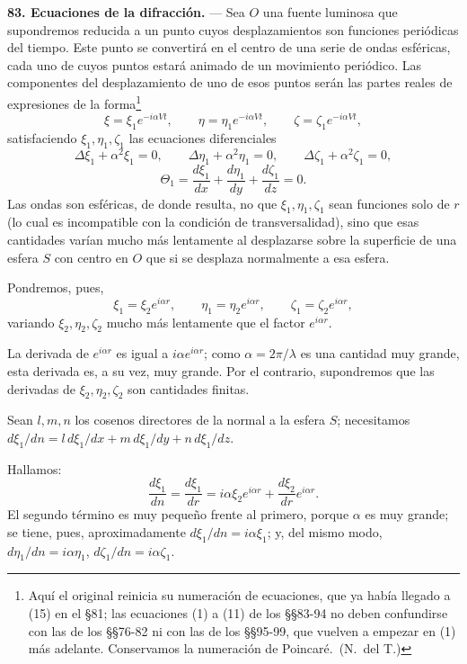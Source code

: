 \noindent\textbf{83. Ecuaciones de la difracción.} — Sea $O$ una fuente
luminosa que supondremos reducida a un punto cuyos desplazamientos son
funciones periódicas del tiempo. Este punto se convertirá en el centro de
una serie de ondas esféricas, cada uno de cuyos puntos estará animado de
un movimiento periódico. Las componentes del desplazamiento de uno de
esos puntos serán las partes reales de expresiones de la
forma\footnote{Aquí el original reinicia su numeración de ecuaciones,
que ya había llegado a (15) en el §81; las ecuaciones (1) a (11) de los
§§83-94 no deben confundirse con las de los §§76-82 ni con las de los
§§95-99, que vuelven a empezar en (1) más adelante. Conservamos la
numeración de Poincaré.~(N.~del T.)}
\begin{equation}
\xi=\xi_1e^{-i\alpha Vt},\qquad \eta=\eta_1e^{-i\alpha Vt},\qquad
\zeta=\zeta_1e^{-i\alpha Vt},
\tag{1}
\end{equation}
satisfaciendo $\xi_1,\eta_1,\zeta_1$ las ecuaciones diferenciales
\begin{equation}
\Delta\xi_1+\alpha^2\xi_1=0,\qquad \Delta\eta_1+\alpha^2\eta_1=0,\qquad
\Delta\zeta_1+\alpha^2\zeta_1=0,
\tag{2}
\end{equation}
\[
\Theta_1=\frac{d\xi_1}{dx}+\frac{d\eta_1}{dy}+\frac{d\zeta_1}{dz}=0.
\]
Las ondas son esféricas, de donde resulta, no que $\xi_1,\eta_1,\zeta_1$
sean funciones solo de $r$ (lo cual es incompatible con la condición de
transversalidad), sino que esas cantidades varían mucho más lentamente al
desplazarse sobre la superficie de una esfera $S$ con centro en $O$ que si
se desplaza normalmente a esa esfera.

Pondremos, pues,
\[
\xi_1=\xi_2e^{i\alpha r},\qquad \eta_1=\eta_2e^{i\alpha r},\qquad
\zeta_1=\zeta_2e^{i\alpha r},
\]
variando $\xi_2,\eta_2,\zeta_2$ mucho más lentamente que el factor
$e^{i\alpha r}$.

La derivada de $e^{i\alpha r}$ es igual a $i\alpha e^{i\alpha r}$; como
$\alpha=2\pi/\lambda$ es una cantidad muy grande, esta derivada es, a su
vez, muy grande. Por el contrario, supondremos que las derivadas de
$\xi_2,\eta_2,\zeta_2$ son cantidades finitas.

Sean $l,m,n$ los cosenos directores de la normal a la esfera $S$;
necesitamos $d\xi_1/dn=l\,d\xi_1/dx+m\,d\xi_1/dy+n\,d\xi_1/dz$.

Hallamos:
\[
\frac{d\xi_1}{dn}=\frac{d\xi_1}{dr}=i\alpha\xi_2e^{i\alpha r}+
\frac{d\xi_2}{dr}e^{i\alpha r}.
\]
El segundo término es muy pequeño frente al primero, porque $\alpha$ es
muy grande; se tiene, pues, aproximadamente $d\xi_1/dn=i\alpha\xi_1$; y,
del mismo modo, $d\eta_1/dn=i\alpha\eta_1$, $d\zeta_1/dn=i\alpha\zeta_1$.

